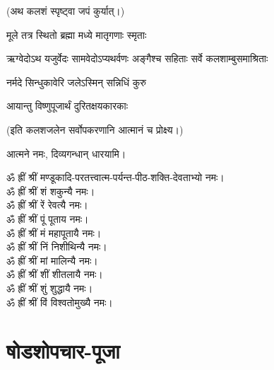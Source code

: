 (अथ कलशं स्पृष्ट्वा जपं कुर्यात्।)

{मूले तत्र स्थितो ब्रह्मा मध्ये मातृगणाः स्मृताः}

{ऋग्वेदोऽथ यजुर्वेदः सामवेदोऽप्यथर्वणः}
{अङ्गैश्च सहिताः सर्वे कलशाम्बुसमाश्रिताः}

{नर्मदे सिन्धुकावेरि जलेऽस्मिन् सन्निधिं कुरु}

{आयान्तु विष्णुपूजार्थं दुरितक्षयकारकाः}


(इति कलशजलेन सर्वोपकरणानि आत्मानं च प्रोक्ष्य।)

आत्मने नमः, दिव्यगन्धान् धारयामि। 



ॐ ह्रीं श्रीं मण्डूकादि-परतत्त्वात्म-पर्यन्त-पीठ-शक्ति-देवताभ्यो नमः।\\
ॐ ह्रीं श्रीं शं शकुन्यै नमः।\\
ॐ ह्रीं श्रीं रें रेवत्यै नमः।\\
ॐ ह्रीं श्रीं पूं पूताय नमः।\\
ॐ ह्रीं श्रीं मं महापूतायै नमः।\\
ॐ ह्रीं श्रीं निं निशीथिन्यै नमः।\\
ॐ ह्रीं श्रीं मां मालिन्यै नमः।\\
ॐ ह्रीं श्रीं शीं शीतलायै नमः।\\
ॐ ह्रीं श्रीं शुं शुद्धायै नमः।\\
ॐ ह्रीं श्रीं विं विश्वतोमुख्यै नमः।\\




\section{षोडशोपचार-पूजा}

